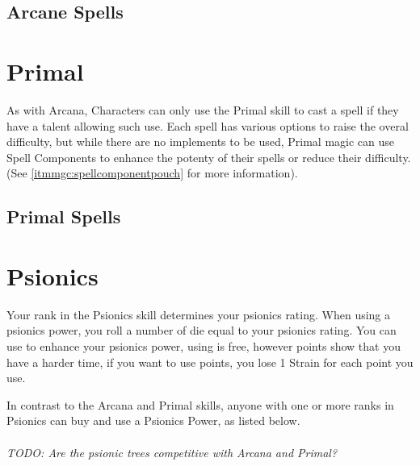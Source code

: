 \begin{multicols}{2}
\subsection{Arcane Spells}





%
\end{multicols}
\begin{multicols}{2}

\section{Primal}

As with Arcana, Characters can only use the Primal skill to cast a spell if they
have a talent allowing such use. Each spell has various options to raise the overal
difficulty, but while there are no implements to be used, Primal magic can use Spell
Components to enhance the potenty of their spells or reduce their difficulty.
(See \cref{itmmgc:spellcomponentpouch} for more information).

\subsection{Primal Spells}





\FloatBarrier

\section{Psionics}
Your rank in the Psionics skill determines your psionics rating.
When using a psionics power, you roll a number of \force die equal to your
psionics rating. You can use \darklight to enhance your psionics power,
using \light is free, however \dark points show that you have a harder time,
if you want to use \dark points, you lose 1 Strain for each \dark point you
use.

In contrast to the Arcana and Primal skills, anyone with one or more ranks
in Psionics can buy and use a Psionics Power, as listed below.\\
\\
\textit{TODO: Are the psionic trees competitive with Arcana and Primal?}

\end{multicols}
\newpage






